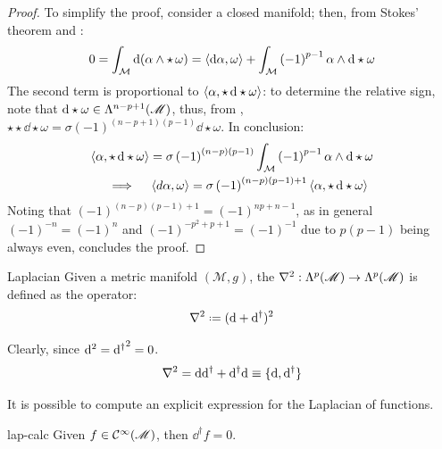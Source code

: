 \begin{proofbox}
  \begin{proof}
    To simplify the proof, consider a closed manifold; then, from Stokes' theorem and :
    \begin{equation*}
      0 = \int_{\mathcal{M}} \mathrm{d} ( \alpha \wedge \star\, \omega ) = \braket{\mathrm{d}\alpha, \omega} + \int_{\mathcal{M}} \left( -1 \right)^{p-1} \alpha \wedge \mathrm{d} \star \omega
    \end{equation*}
    The second term is proportional to $ \braket{\alpha, \star\, \mathrm{d} \star \omega} $: to determine the relative sign, note that $ \mathrm{d} \star \omega \in \Lambda^{n-p+1}(\mathscr{M}) $, thus, from , $ \star \star \dd \star \omega = \sigma \left( -1 \right)^{(n-p+1)(p-1)} \dd \star \omega $. In conclusion:
    \begin{multline*}
      \braket{\alpha, \star\, \mathrm{d} \star \omega} = \sigma \left( -1 \right)^{(n-p)(p-1)} \int_{\mathcal{M}} \left( -1 \right)^{p-1} \alpha \wedge \mathrm{d} \star \omega \\
      \quad \implies \quad
      \braket{d\alpha, \omega} = \sigma \left( -1 \right)^{(n-p)(p-1) + 1} \braket{\alpha, \star\, \mathrm{d} \star \omega}
    \end{multline*}
    Noting that $ \left( -1 \right)^{(n-p)(p-1) + 1} = \left( -1 \right)^{np + n - 1} $, as in general $ \left( -1 \right)^{-n} = \left( -1 \right)^n $ and $ \left( -1 \right)^{-p^2 + p + 1} = \left( -1 \right)^{-1} $ due to $ p (p-1) $ being always even, concludes the proof.
  \end{proof}
\end{proofbox}

\begin{definition}{Laplacian}{}
  Given a metric manifold $ (\mathcal{M},g) $, the  $ \nabla^2 : \Lambda^{p}(\mathscr{M}) \rightarrow \Lambda^{p}(\mathscr{M}) $ is defined as the operator:
  \begin{equation}
    \lap \defeq ( \dd + \dd^{\dagger} )^2
  \end{equation}
\end{definition}

Clearly, since $ \mathrm{d}^2 = {\mathrm{d}^\dagger}^2 = 0 $.
\begin{equation}
  \nabla^2 = \mathrm{d}\mathrm{d}^{\dagger} + \mathrm{d}^{\dagger}\mathrm{d} \equiv \{\mathrm{d},\mathrm{d}^{\dagger}\}
\end{equation}

It is possible to compute an explicit expression for the Laplacian of functions.

\begin{lemma}{}{lap-calc}
  Given $ f \in \mathcal{C}^{\infty}(\mathscr{M}) $, then $ \dd^{\dagger} f = 0 $.
\end{lemma}


